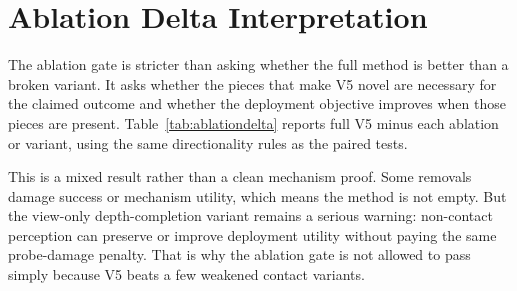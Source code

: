 \documentclass{article}
\begin{document}
\section{Ablation Delta Interpretation}
The ablation gate is stricter than asking whether the full method is better than a broken variant. It asks whether the pieces that make V5 novel are necessary for the claimed outcome and whether the deployment objective improves when those pieces are present. Table~\ref{tab:ablationdelta} reports full V5 minus each ablation or variant, using the same directionality rules as the paired tests.


\begin{table}[t]
\centering
\scriptsize
{}
\caption{Full V5 minus ablation/variant on the ablation protocol. Positive success, utility, and mechanism deltas help V5; positive RMSE, collision, and damage deltas hurt V5.}
\label{tab:ablationdelta}
\end{table}


This is a mixed result rather than a clean mechanism proof. Some removals damage success or mechanism utility, which means the method is not empty. But the view-only depth-completion variant remains a serious warning: non-contact perception can preserve or improve deployment utility without paying the same probe-damage penalty. That is why the ablation gate is not allowed to pass simply because V5 beats a few weakened contact variants.
\end{document}

